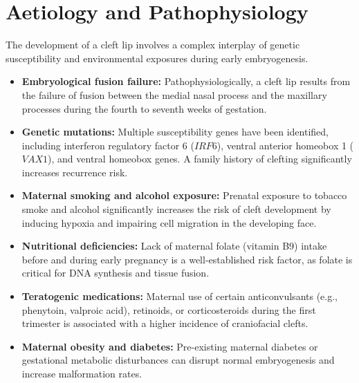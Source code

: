 \section*{Aetiology and Pathophysiology}
The development of a cleft lip involves a complex interplay of genetic susceptibility and environmental exposures during early embryogenesis.
\begin{itemize}
    \item \textbf{Embryological fusion failure:} Pathophysiologically, a cleft lip results from the failure of fusion between the medial nasal process and the maxillary processes during the fourth to seventh weeks of gestation.
    \item \textbf{Genetic mutations:} Multiple susceptibility genes have been identified, including interferon regulatory factor 6 ($IRF6$), ventral anterior homeobox 1 ($VAX1$), and ventral homeobox genes. A family history of clefting significantly increases recurrence risk.
    \item \textbf{Maternal smoking and alcohol exposure:} Prenatal exposure to tobacco smoke and alcohol significantly increases the risk of cleft development by inducing hypoxia and impairing cell migration in the developing face.
    \item \textbf{Nutritional deficiencies:} Lack of maternal folate (vitamin B9) intake before and during early pregnancy is a well-established risk factor, as folate is critical for DNA synthesis and tissue fusion.
    \item \textbf{Teratogenic medications:} Maternal use of certain anticonvulsants (e.g., phenytoin, valproic acid), retinoids, or corticosteroids during the first trimester is associated with a higher incidence of craniofacial clefts.
    \item \textbf{Maternal obesity and diabetes:} Pre-existing maternal diabetes or gestational metabolic disturbances can disrupt normal embryogenesis and increase malformation rates.
\end{itemize}

